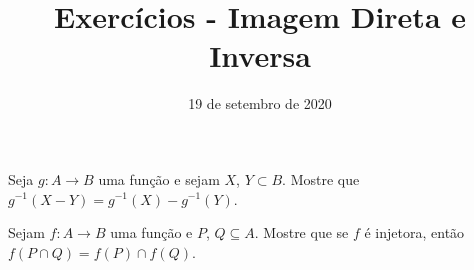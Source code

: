 \documentclass{beamer}
\title{Exercícios - Imagem Direta e Inversa}
\author[\autor]{\autor}
\institute[\instituto]{\instituto}
\date{19 de setembro de 2020}
\begin{document}
    \begin{frame}
        \maketitle
    \end{frame}

    
    \begin{frame}
        \begin{exercicio}
            Seja $g : A\to B$ uma fun{\c c}{\~a}o e sejam $X$, $Y\subset B$. Mostre que $g^{-1}(X - Y)= g^{-1}(X) - g^{-1}(Y)$.
        \end{exercicio}

        \vspace{6cm}
    \end{frame}

    \begin{frame}
        
    \end{frame}

    \begin{frame}
        \begin{exercicio}
            Sejam $f : A \to B$ uma fun{\c c}{\~a}o e $P$, $Q \subseteq A$. Mostre que se $f$ \'e injetora, ent{\~a}o $f(P \cap Q) = f(P) \cap f(Q)$.
        \end{exercicio}

        \vspace{6cm}
    \end{frame}

    \begin{frame}
        
    \end{frame}
\end{document}
